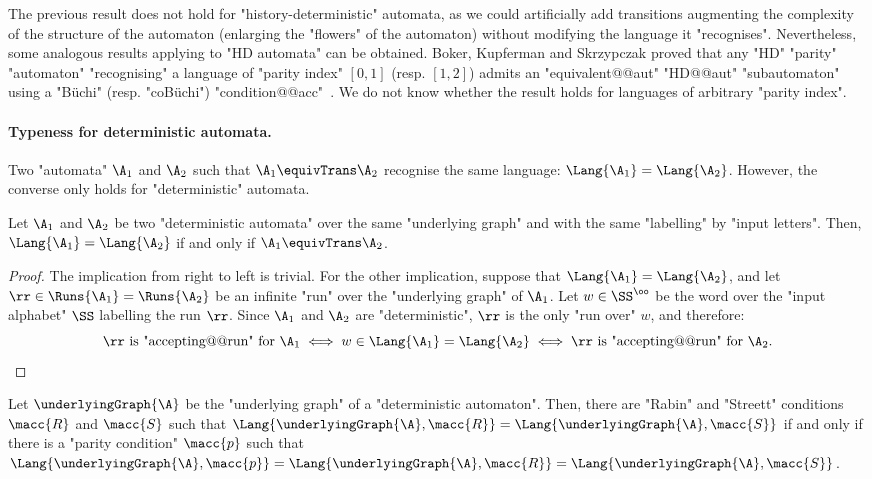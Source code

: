 \documentclass{theoretics}
\begin{document}
The previous result does not hold for "history-deterministic" automata, as we could artificially add transitions augmenting the complexity of the structure of the automaton (enlarging the "flowers" of the automaton) without modifying the language it "recognises". Nevertheless, some analogous results applying to "HD automata" can be obtained.  Boker, Kupferman and Skrzypczak proved that any "HD" "parity" "automaton" "recognising" a language of "parity index" $[0,1]$ (resp. $[1,2]$) admits an "equivalent@@aut" "HD@@aut" "subautomaton" using a "B\"uchi" (resp. "coB\"uchi") "condition@@acc"~\cite[Theorems~10 and~13]{BKS17HowDeterministicGFG}. We do not know whether the result holds for languages of arbitrary "parity index".


\paragraph*{Typeness for deterministic automata.}
Two "automata" $\A_1$ and $\A_2$ such that $\A_1 \equivTrans \A_2$ recognise the same language: $\Lang{\A_1} = \Lang{\A_2}$. However, the converse only holds for "deterministic" automata.

\begin{lemma}\label{lemma-typ:equivalece_automata_languages}
	Let $\A_1$ and $\A_2$ be two "deterministic automata" over the same "underlying graph" and with the same "labelling" by "input letters". Then, $\Lang{\A_1} = \Lang{\A_2}$ if and only if $\A_1 \equivTrans \A_2$.
\end{lemma}
\begin{proof}
	The implication from right to left is trivial. For the other implication, suppose that $\Lang{\A_1} = \Lang{\A_2}$, and let $\rr \in \Runs{\A_1}=\Runs{\A_2}$ be an infinite "run" over the "underlying graph" of $\A_1$. Let $w\in \SS^\oo$ be the word over the "input alphabet" $\SS$ labelling the run $\rr$. Since $\A_1$ and $\A_2$ are "deterministic", $\rr$ is the only "run over" $w$, and therefore:
	\[ \rr \text{ is "accepting@@run" for } \A_1 \iff w\in \Lang{\A_1}=\Lang{\A_2} \iff \rr \text{ is "accepting@@run" for } \A_2. \qedhere\]
\end{proof}

\begin{corollary}
	Let $\underlyingGraph{\A}$ be the "underlying graph" of a "deterministic automaton". Then, there are "Rabin" and "Streett" conditions $\macc{R}$ and $\macc{S}$ such that $\Lang{\underlyingGraph{\A},\macc{R}} = \Lang{\underlyingGraph{\A},\macc{S}}$ if and only if there is a "parity condition" $\macc{p}$ such that $\Lang{\underlyingGraph{\A},\macc{p}}=\Lang{\underlyingGraph{\A},\macc{R}} = \Lang{\underlyingGraph{\A},\macc{S}}$.
\end{corollary}
\end{document}
